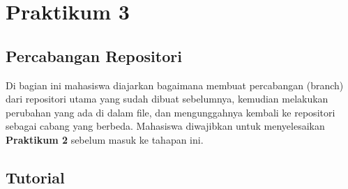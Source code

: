 \documentclass[a4paper, 12pt]{report}
\begin{document}
  	
  	\chapter{Praktikum 3}
  		\section{Percabangan Repositori}
  	Di bagian ini mahasiswa diajarkan bagaimana membuat percabangan (branch) dari repositori utama yang sudah dibuat sebelumnya, kemudian melakukan perubahan yang ada di dalam file, dan mengunggahnya kembali ke repositori sebagai cabang yang berbeda. Mahasiswa diwajibkan untuk menyelesaikan \textbf{Praktikum 2} sebelum masuk ke tahapan ini.
  	
  	\section{Tutorial}
\end{document}
